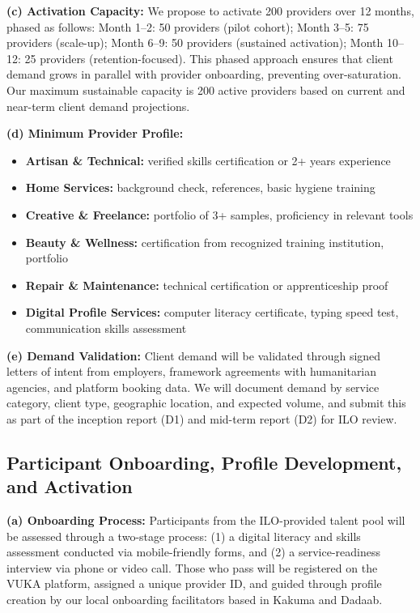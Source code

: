 \documentclass[11pt,a4paper]{article}
\begin{document}
\noindent \textbf{(c) Activation Capacity:} We propose to activate 200 providers over 12 months, phased as follows: Month 1--2: 50 providers (pilot cohort); Month 3--5: 75 providers (scale-up); Month 6--9: 50 providers (sustained activation); Month 10--12: 25 providers (retention-focused). This phased approach ensures that client demand grows in parallel with provider onboarding, preventing over-saturation. Our maximum sustainable capacity is 200 active providers based on current and near-term client demand projections.

\noindent \textbf{(d) Minimum Provider Profile:}
\begin{itemize}[leftmargin=*]
    \item \textbf{Artisan \& Technical:} verified skills certification or 2+ years experience
    \item \textbf{Home Services:} background check, references, basic hygiene training
    \item \textbf{Creative \& Freelance:} portfolio of 3+ samples, proficiency in relevant tools
    \item \textbf{Beauty \& Wellness:} certification from recognized training institution, portfolio
    \item \textbf{Repair \& Maintenance:} technical certification or apprenticeship proof
    \item \textbf{Digital Profile Services:} computer literacy certificate, typing speed test, communication skills assessment
\end{itemize}

\noindent \textbf{(e) Demand Validation:} Client demand will be validated through signed letters of intent from employers, framework agreements with humanitarian agencies, and platform booking data. We will document demand by service category, client type, geographic location, and expected volume, and submit this as part of the inception report (D1) and mid-term report (D2) for ILO review.

\subsection{Participant Onboarding, Profile Development, and Activation}
\textbf{(a) Onboarding Process:} Participants from the ILO-provided talent pool will be assessed through a two-stage process: (1) a digital literacy and skills assessment conducted via mobile-friendly forms, and (2) a service-readiness interview via phone or video call. Those who pass will be registered on the VUKA platform, assigned a unique provider ID, and guided through profile creation by our local onboarding facilitators based in Kakuma and Dadaab.
\end{document}
